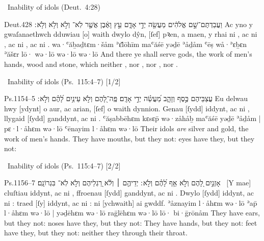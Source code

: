 \begin{frame}{\ex\ Inability of idols \hfill (Deut.~4:28)}
	\begin{example}{Deut.}{4}{28}{}{}
		\quoling
		{וַעֲבַדְתֶּם־שָׁ֣ם אֱלֹהִ֔ים מַעֲשֵׂ֖ה יְדֵ֣י אָדָ֑ם עֵ֣ץ וָאֶ֔בֶן אֲשֶׁ֤ר לֹֽא־ וְלֹ֣א  וְלֹ֥א  וְלֹ֥א ׃}
		{Ac yno y gwaſanaethwch dduwiau [o] waith dwylo dŷn, [ſef] pꝛen, a maen, y rhai ni , ac ni , ac ni , ac ni .}
		{wa·ʿăḇaḏtɛm·šåm ʾɛ̆lōhīm maʿăśē yəḏē ʾåḏåm ʿēṣ wå·ʾɛḇɛn ʾăšɛr lō· wə·lō  wə·lō  wə·lō }
		{And there ye shall serve gods, the work of men’s hands, wood and stone, which neither , nor , nor , nor .}
	\end{example}
\end{frame}



\begin{frame}{\ex\ Inability of idols \hfill (Ps.~115:4–7) [1/2]}
	\begin{example}{Ps.}{115}{4–5}{}{}
		\quoling
		{%
			עֲצַבֵּיהֶם כֶּ֣סֶף וְזָהָ֑ב מַ֝עֲשֵׂ֗ה יְדֵ֣י אָדָֽם׃
			פֶּֽה־לָ֭הֶם וְלֹ֣א  עֵינַ֥יִם לָ֝הֶ֗ם וְלֹ֣א ׃
		}
		{%
			Eu delwau hwy [ydynt] o aur, ac arian, [ſef] o waith dynnion.
			Genau [ſydd] iddynt, ac ni , llygaid [ſydd] ganddynt, ac ni .
		}
		{%
			ʿăṣabbēhɛm kɛsɛp̄ wə·zåhåḇ maʿăśē yəḏē ʾåḏåm |
			pɛ·l·åhɛm wə·lō  ʿēnayim l·åhɛm wə·lō 
		}
		{%
			Their idols \textit{are} silver and gold, the work of men’s hands.
			They have mouths, but they  not: eyes have they, but they  not:
		}
	\end{example}
\end{frame}



\begin{frame}{\excont\ Inability of idols \hfill (Ps.~115:4–7) [2/2]}
	\begin{example}{Ps.}{115}{6–7}{}{}
		\quoling
		{%
			אָזְנַ֣יִם לָ֭הֶם וְלֹ֣א  אַ֥ף לָ֝הֶ֗ם וְלֹ֣א ׃
			יְדֵיהֶ֤ם ׀ וְלֹ֬א  רַ֭גְלֵיהֶם וְלֹ֣א  לֹֽא־ בִּגְרוֹנָֽם׃
		}
		{%
			~[Y mae] cluſtiau iddynt, ac ni , ffroenau [ſydd] ganddynt, ac ni .
			Dwylo [ſydd] iddynt, ac ni : traed [ſy] iddynt, ac ni : ni  [ychwaith] ai gwddf.
		}
		{%
			ʾåznayim l·åhɛm wə·lō  ʾap̄ l·åhɛm wə·lō  |
			yəḏēhɛm wə·lō  raḡlēhɛm wə·lō  lō· bi·ḡrōnåm
		}
		{%
			They have ears, but they  not: noses have they, but they  not:
			They have hands, but they  not: feet have they, but they  not: neither  they through their throat.
		}
	\end{example}
\end{frame}



